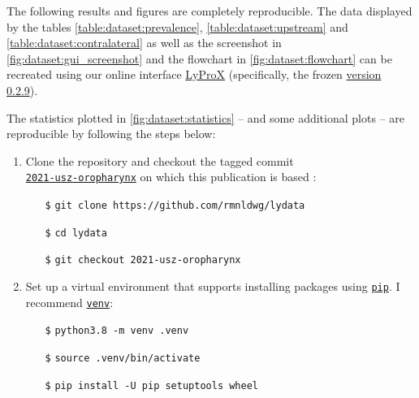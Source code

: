 \begin{tcolorbox}[title=\faIcon{recycle} Reproducibility, parbox=false]
    The following results and figures are completely reproducible. The data displayed by the tables \cref{table:dataset:prevalence}, \cref{table:dataset:upstream} and \cref{table:dataset:contralateral} as well as the screenshot in \cref{fig:dataset:gui_screenshot} and the flowchart in \cref{fig:dataset:flowchart} can be recreated using our online interface \href{https://lyprox.org}{ LyProX} (specifically, the frozen \href{https://2021-oropharynx.lyprox.org}{ version 0.2.9}).
    
    The statistics plotted in \cref{fig:dataset:statistics} -- and some additional plots -- are reproducible by following the steps below:

    \begin{enumerate}
        \item Clone the  repository and checkout the tagged commit \\
        \href{https://github.com/rmnldwg/lydata/tree/2021-usz-oropharynx}{ \texttt{2021-usz-oropharynx}} on which this publication is based \cite{ludwig_detailed_2021}:
        \begin{itemize}[leftmargin=10mm]
            \setlength\itemsep{-0.5em}
            \item[\texttt{\$}] \verb|git clone https://github.com/rmnldwg/lydata|
            \item[\texttt{\$}] \verb|cd lydata|
            \item[\texttt{\$}] \verb|git checkout 2021-usz-oropharynx|
        \end{itemize}

        \item Set up a virtual environment that supports installing packages using \href{https://pypi.org/project/pip/}{\texttt{pip}}. I recommend \href{https://docs.python.org/3/library/venv.html}{\texttt{venv}}:
        \begin{itemize}[leftmargin=10mm]
            \setlength\itemsep{-0.5em}
            \item[\texttt{\$}] \verb|python3.8 -m venv .venv|
            \item[\texttt{\$}] \verb|source .venv/bin/activate|
            \item[\texttt{\$}] \verb|pip install -U pip setuptools wheel|
        \end{itemize}


\end{enumerate}
\end{tcolorbox}
